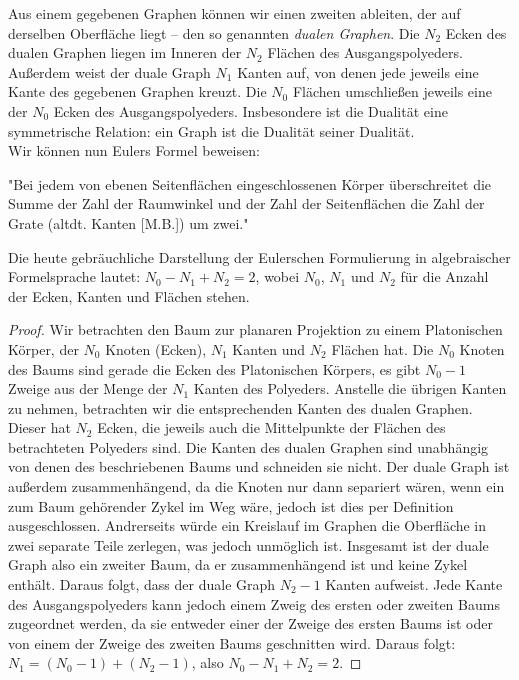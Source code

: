 Aus einem gegebenen Graphen können wir einen zweiten ableiten, der auf derselben Oberfläche liegt -- den so genannten \textit{dualen Graphen}.
Die $N_2$ Ecken des dualen Graphen liegen im Inneren der $N_2$ Flächen des Ausgangspolyeders. Außerdem weist der duale Graph $N_1$ Kanten auf, von denen jede jeweils eine Kante des gegebenen Graphen kreuzt. Die $N_0$ Flächen umschließen jeweils eine der $N_0$ Ecken des Ausgangspolyeders. Insbesondere ist die Dualität eine symmetrische Relation: ein Graph ist die Dualität seiner Dualität.\\
Wir können nun Eulers Formel beweisen:
\begin{theorem}
"Bei jedem von ebenen Seitenflächen eingeschlossenen Körper überschreitet die Summe der Zahl der Raumwinkel und der Zahl der Seitenflächen die Zahl der Grate (altdt. Kanten [M.B.]) um zwei."
\end{theorem}
Die heute gebräuchliche Darstellung der Eulerschen Formulierung in algebraischer Formelsprache lautet:
$N_0 - N_1 + N_2 =2 $, wobei $N_0$, $N_1$ und $N_2$ für die Anzahl der Ecken, Kanten und Flächen stehen.
\begin{proof}
Wir betrachten den Baum zur planaren Projektion zu einem Platonischen Körper, der $N_0$ Knoten (Ecken), $N_1$ Kanten und $N_2$ Flächen hat. Die $N_0$ Knoten des Baums sind gerade die Ecken des Platonischen Körpers, es gibt $N_0 -1$ Zweige aus der Menge der $N_1$ Kanten des Polyeders. Anstelle die übrigen Kanten zu nehmen, betrachten wir die entsprechenden Kanten des dualen Graphen. Dieser hat $N_2$ Ecken, die jeweils auch die Mittelpunkte der Flächen des betrachteten Polyeders sind. Die Kanten des dualen Graphen sind unabhängig von denen des beschriebenen Baums und schneiden sie nicht. Der duale Graph ist außerdem zusammenhängend, da die Knoten nur dann separiert wären, wenn ein zum Baum gehörender Zykel im Weg wäre, jedoch ist dies per Definition ausgeschlossen. Andrerseits würde ein Kreislauf im Graphen die Oberfläche in zwei separate Teile zerlegen, was jedoch unmöglich ist. Insgesamt ist der duale Graph also ein zweiter Baum, da er zusammenhängend ist und keine Zykel enthält. Daraus folgt, dass der duale Graph $N_2-1$ Kanten aufweist. Jede Kante des Ausgangspolyeders kann jedoch einem Zweig des ersten oder zweiten Baums zugeordnet werden, da sie entweder einer der Zweige des ersten Baums ist oder von einem der Zweige des zweiten Baums geschnitten wird. Daraus folgt: $N_1 = (N_0-1) + (N_2-1)$, also $N_0 - N_1 + N_2 =2 $.
\end{proof}
